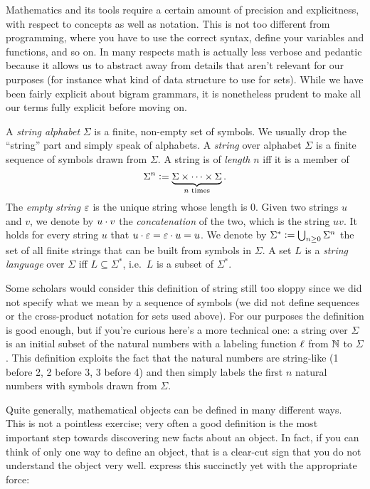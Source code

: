 Mathematics and its tools require a certain amount of precision and explicitness, with respect to concepts as well as notation.
This is not too different from programming, where you have to use the correct syntax, define your variables and functions, and so on.
In many respects math is actually less verbose and pedantic because it allows us to abstract away from details that aren't relevant for our purposes (for instance what kind of data structure to use for sets).
While we have been fairly explicit about bigram grammars, it is nonetheless prudent to make all our terms fully explicit before moving on.

\begin{definition}
    A \emph{string alphabet} $\Sigma$ is a finite, non-empty set of symbols.
    We usually drop the ``string'' part and simply speak of alphabets.
    A \emph{string} over alphabet $\Sigma$ is a finite sequence of symbols drawn from $\Sigma$.
    A string is of \emph{length} $n$ iff it is a member of
    \[
        \Sigma^n \mathrel{\mathop:}= \underbrace{\Sigma \times \cdots \times \Sigma}_{n \text{ times}}.
    \]
    The \emph{empty string} $\varepsilon$ is the unique string whose length is $0$.
    Given two strings $u$ and $v$, we denote by $u \cdot v$ the \emph{concatenation} of the two, which is the string $uv$.
    It holds for every string $u$ that $u \cdot \varepsilon = \varepsilon \cdot u = u$.
    We denote by $\Sigma^* \mathrel{\mathop:}= \bigcup_{n \geq 0} \Sigma^n$ the set of all finite strings that can be built from symbols in $\Sigma$.
    A set $L$ is a \emph{string language} over $\Sigma$ iff $L \subseteq \Sigma^*$, i.e.\ $L$ is a subset of $\Sigma^*$.
\end{definition}
%
Some scholars would consider this definition of string still too sloppy since we did not specify what we mean by a sequence of symbols (we did not define sequences or the cross-product notation for sets used above).
For our purposes the definition is good enough, but if you're curious here's a more technical one: a string over $\Sigma$ is an initial subset of the natural numbers with a labeling function $\ell$ from $\mathbb{N}$ to $\Sigma$.
This definition exploits the fact that the natural numbers are string-like (1 before 2, 2 before 3, 3 before 4) and then simply labels the first $n$ natural numbers with symbols drawn from $\Sigma$.

Quite generally, mathematical objects can be defined in many different ways.
This is not a pointless exercise; very often a good definition is the most important step towards discovering new facts about an object.
In fact, if you can think of only one way to define an object, that is a clear-cut sign that you do not understand the object very well.
\citet[10]{KeenanMoss12} express this succinctly yet with the appropriate force:
%
\begin{center}
\end{center}

